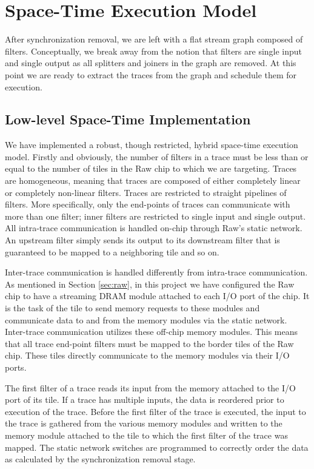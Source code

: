 \section{Space-Time Execution Model}
\label{sec:implementation}
After synchronization removal, we are left with a flat stream graph
composed of filters.  Conceptually, we break away from the notion that
filters are single input and single output as all splitters and
joiners in the graph are removed.  At this point we are ready to
extract the traces from the graph and schedule them for execution.  


\subsection{Low-level Space-Time Implementation}
We have implemented a robust, though restricted, hybrid
space-time execution model.  Firstly and obviously, the number of
filters in a trace must be less than or equal to the number of tiles
in the Raw chip to which we are targeting.  Traces are homogeneous,
meaning that traces are composed of either completely linear or
completely non-linear filters.  Traces are restricted to
straight pipelines of filters.  More specifically, only the end-points
of traces can communicate with more than one filter; inner filters are
restricted to single input and single output.  All intra-trace
communication is handled on-chip through Raw's static network.  An
upstream filter simply sends its output to its downstream filter that
is guaranteed to be mapped to a neighboring tile and so on.

Inter-trace communication is handled differently from intra-trace
communication.  As mentioned in Section \ref{sec:raw}, in this
project we have configured the Raw chip to have a streaming DRAM
module attached to each I/O port of the chip.  It is the task of the
tile to send memory requests to these modules and communicate data to
and from the memory modules via the static network.  Inter-trace
communication utilizes these off-chip memory modules.  This means that
all trace end-point filters must be mapped to the border tiles of the
Raw chip.  These tiles directly communicate to the memory modules via
their I/O ports.  

The first filter of a trace reads its input from the memory attached
to the I/O port of its tile.  If a trace has multiple inputs, the data
is reordered prior to execution of the trace.  Before the first filter
of the trace is executed, the input to the trace is gathered from the
various memory modules and written to the memory module attached to
the tile to which the first filter of the trace was mapped.  The
static network switches are programmed to correctly order the data as
calculated by the synchronization removal stage.

